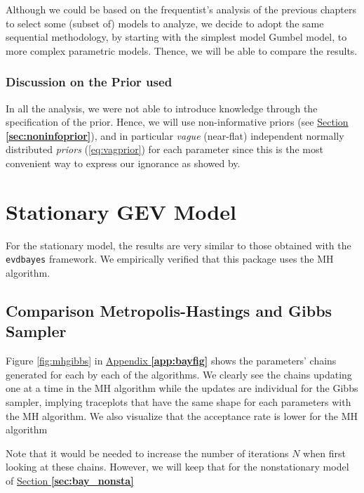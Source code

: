 Although we could be based on the frequentist's analysis of the previous chapters to select some (subset of) models to analyze, we decide to adopt the same sequential methodology, by starting with the simplest model Gumbel model, to more complex parametric models. 
Thence, we will be able to compare the results.


\subsubsection*{Discussion on the Prior used}

In all the analysis, we were not able to introduce knowledge through the specification of the prior. Hence, we will use non-informative priors (see \hyperref[sec:noninfoprior]{Section \textbf{\ref{sec:noninfoprior}}}), and in particular \emph{vague} (near-flat) independent normally distributed \emph{priors} (\ref{eq:vagprior}) for each parameter since this is the most convenient way to express our ignorance as showed by.


\section{Stationary GEV Model}\label{sec:baystatio}


For the stationary model, the results are very similar to those obtained with the \texttt{evdbayes} framework. We empirically verified that this package uses the MH algorithm.


\subsection{Comparison Metropolis-Hastings and Gibbs Sampler}



Figure \ref{fig:mhgibbs} in \hyperref[app:bayfig]{Appendix \textbf{\ref{app:bayfig}}}
shows the parameters' chains generated for each by each of the algorithms. 
We clearly see the chains updating one at a time in the MH algorithm while the updates are individual for the Gibbs sampler, implying traceplots that have the same shape for each parameters with the MH algorithm. We also visualize that the acceptance rate is lower for the MH algorithm

Note that it would be needed to increase the number of iterations $N$ when first looking at these chains. However, we will keep that for the nonstationary model of \hyperref[sec:bay_nonsta]{Section \textbf{\ref{sec:bay_nonsta}}}


